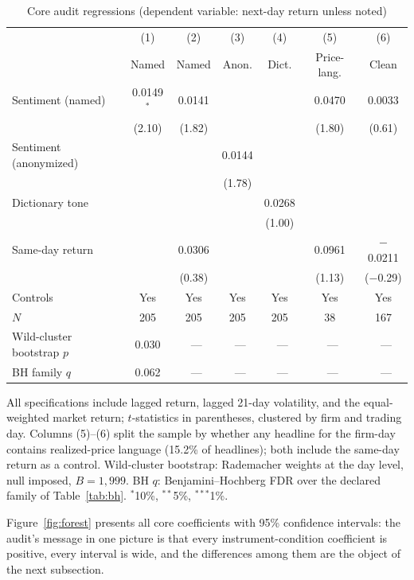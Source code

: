 \begin{table}[htbp]
\centering
\small
\caption{Core audit regressions (dependent variable: next-day return unless noted)}
\label{tab:core}
\begin{threeparttable}
\begin{tabular}{lcccccc}
\toprule
 & (1) & (2) & (3) & (4) & (5) & (6) \\
 & Named & Named & Anon. & Dict. & Price-lang. & Clean \\
\midrule
Sentiment (named) & 0.0149$^{*}$ & 0.0141 & & & 0.0470 & 0.0033 \\
 & (2.10) & (1.82) & & & (1.80) & (0.61) \\
Sentiment (anonymized) & & & 0.0144 & & & \\
 & & & (1.78) & & & \\
Dictionary tone & & & & 0.0268 & & \\
 & & & & (1.00) & & \\
Same-day return & & 0.0306 & & & 0.0961 & $-$0.0211 \\
 & & (0.38) & & & (1.13) & ($-$0.29) \\
Controls & Yes & Yes & Yes & Yes & Yes & Yes \\
\midrule
$N$ & 205 & 205 & 205 & 205 & 38 & 167 \\
Wild-cluster bootstrap $p$ & 0.030 &~--- &~--- &~--- &~--- &~--- \\
BH family $q$ & 0.062 &~--- &~--- &~--- &~--- &~--- \\
\bottomrule
\end{tabular}
\begin{tablenotes}[flushleft]\footnotesize
\item All specifications include lagged return, lagged 21-day volatility, and the equal-weighted market return; $t$-statistics in parentheses, clustered by firm and trading day. Columns (5)--(6) split the sample by whether any headline for the firm-day contains realized-price language (15.2\% of headlines); both include the same-day return as a control. Wild-cluster bootstrap: Rademacher weights at the day level, null imposed, $B=1{,}999$. BH $q$: Benjamini--Hochberg FDR over the declared family of Table~\ref{tab:bh}. $^{*}$10\%, $^{**}$5\%, $^{***}$1\%.
\end{tablenotes}
\end{threeparttable}
\end{table}

Figure~\ref{fig:forest} presents all core coefficients with 95\% confidence intervals: the audit's message in one picture is that every instrument-condition coefficient is positive, every interval is wide, and the differences among them are the object of the next subsection.

